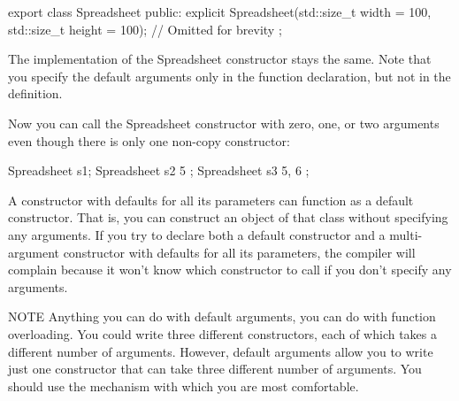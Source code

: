 \begin{cpp}
export class Spreadsheet
{
    public:
        explicit Spreadsheet(std::size_t width = 100, std::size_t height = 100);
        // Omitted for brevity
};
\end{cpp}

The implementation of the Spreadsheet constructor stays the same. Note that you specify the default arguments only in the function declaration, but not in the definition.

Now you can call the Spreadsheet constructor with zero, one, or two arguments even though there is only one non-copy constructor:

\begin{cpp}
Spreadsheet s1;
Spreadsheet s2 { 5 };
Spreadsheet s3 { 5, 6 };
\end{cpp}

A constructor with defaults for all its parameters can function as a default constructor. That is, you can construct an object of that class without specifying any arguments. If you try to declare both a default constructor and a multi-argument constructor with defaults for all its parameters, the compiler will complain because it won’t know which constructor to call if you don’t specify any arguments.

\begin{myNotic}{NOTE}
Anything you can do with default arguments, you can do with function overloading. You could write three different constructors, each of which takes a different number of arguments. However, default arguments allow you to write just one constructor that can take three different number of arguments. You should use the mechanism with which you are most comfortable.
\end{myNotic}














